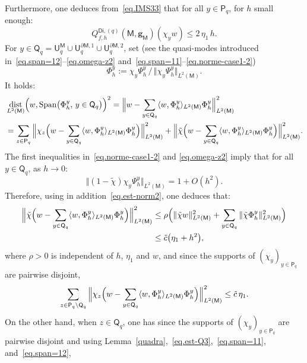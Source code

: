 \documentclass[10pt]{amsart}
\DeclareMathOperator{\dist}{dist}
\DeclareMathOperator{\Span}{Span}
\newcommand{\mbf}[1]{\mathbf{#1}}
\let\lp\langle
\let\rp\rangle
\let\pa\partial
\theoremstyle{plain}
\theoremstyle{definition}
\begin{document}
Furthermore, one deduces from~\eqref{eq.IMS33} that for all $y\in \mathsf P_q$, for $h$ small enough:
\begin{equation}\label{eq.est-Q3}
Q_{f,h}^{\mathsf{Di},(q)}(\mathsf M,\mbf g_{\mathsf M})(\chi_y w) \le 2\, \eta_1\, h.
\end{equation}
For $y\in \mathsf Q_q= \mathsf U_q^{\mathsf M}\cup \mathsf U^{\pa
\mathsf M,1}_q\cup \mathsf U^{\pa \mathsf M,2}_q$, set (see the
quasi-modes introduced in~\eqref{eq.span=12}--\eqref{eq.omega-z2} and~\eqref{eq.span=11}--\eqref{eq.norme-case1-2})
\begin{equation}\label{eq.PHIY}
\Phi_h^y:= \chi_y\Psi_h^y\, /\, \Vert \chi_y \Psi_h^y \Vert_{L^2(\mathsf M)}.
\end{equation}
It holds:
\begin{align*}
&\dist_{L^2(\mathsf M)}\Bigl(w, \Span \bigl(\Phi_h^y, \, y\in \mathsf Q_q \bigr) \Bigr)^2= \Big \Vert w- \sum_{y \in \mathsf Q_q} \lp w, \Phi_h^y\rp _{L^2(\mathsf M)} \Phi_h^y \Big \Vert_{L^2(\mathsf M)}^2\\
&= \sum_{z\in \mathsf P_q}\Big \Vert \chi_z\Bigl(w- \sum_{y
\in \mathsf Q_q} \lp w, \Phi_h^y\rp _{L^2(\mathsf M)} \Phi_h^y\Bigr) \Big \Vert_{L^2(\mathsf M)}^2 +\Big\Vert \tilde \chi\Bigl(w- \sum_{y \in \mathsf Q_q} \lp w, \Phi_h^y\rp _{L^2(\mathsf M)} \Phi_h^y\Bigr) \Big\Vert_{L^2(\mathsf M)}^2.
\end{align*}
The first inequalities in~\eqref{eq.norme-case1-2} and \eqref{eq.omega-z2} imply that for all $y\in \mathsf Q_q$, as $h\to 0$:
\[
\Vert (1-\tilde \chi)\chi_y \Psi_h^y \Vert_{L^2(\mathsf M)} =1+O (h^{2}).
\]
Therefore, using in addition~\eqref{eq.est-norm2}, one deduces that:
\[
\begin{aligned}\Big\Vert \tilde \chi\Bigl(w- \sum_{y \in
\mathsf Q_q} \lp w, \Phi_h^y\rp _{L^2(\mathsf M)}
\Phi_h^y\Bigr) \Big\Vert_{L^2(\mathsf M)}^2 &\le \rho \Bigl(\Vert\tilde \chi w \Vert_{L^2(\mathsf M)}^2 + \sum_{y \in
\mathsf Q_q} \Vert\tilde \chi \Phi_h^y \Vert_{L^2(\mathsf
M)}^2 \Bigr)\\
&\le \tilde c \bigl(\eta_1 +h^2\bigr),
\end{aligned}
\]
where $\rho>0$ is independent of $h$, $\eta_1$ and $w$,
and since the supports of $(\chi_y)_{y\in \mathsf P_q}$ are pairwise disjoint,
\[
\sum_{z\in \mathsf P_q\setminus \mathsf Q_q}\Big \Vert \chi_z\Bigl(w- \sum_{y \in \mathsf Q_q} \lp w, \Phi_h^y\rp _{L^2(\mathsf M)} \Phi_h^y\Bigr) \Big \Vert_{L^2(\mathsf M)}^2 \le \tilde c\, \eta_1.
\]
On the other hand, when $z\in \mathsf Q_q$, one has since the supports of $(\chi_y)_{y\in \mathsf P_q}$ are pairwise disjoint and using Lemma~\ref{quadra},~\eqref{eq.est-Q3},~\eqref{eq.span=11}, and~\eqref{eq.span=12},
\end{document}
